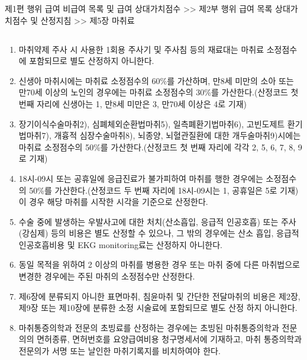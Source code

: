 \begin{mdframed}[linecolor=blue,middlelinewidth=2]  
제1편 행위 급여 \cntrdot{}  비급여 목록 및 급여 상대가치점수 >> 제2부 행위 급여 목록\cntrdot{} 상대가치점수 및 산정지침 >> 제5장 마취료
\end{mdframed}
\subsection{}
\begin{enumerate}[(1)]\tightlist
\item 마취약제 주사 시 사용한 1회용 주사기 및 주사침 등의 재료대는 마취료 소정점수에 포함되므로 별도 산정하지 아니한다.
\item 신생아 마취시에는 마취료 소정점수의 60\%를 가산하며, 만8세 미만의 소아 또는 만70세 이상의 노인의 경우에는 마취료 소정점수의 30\%를 가산한다.(산정코드 첫 번째 자리에 신생아는 1, 만8세 미만은 3, 만70세 이상은 4로 기재)
\item 장기이식수술마취2), 심폐체외순환법마취5), 일측폐환기법마취6), 고빈도제트 환기법마취7), 개흉적 심장수술마취8), 뇌종양, 뇌혈관질환에 대한 개두술마취9)시에는 마취료 소정점수의 50\%를 가산한다.(산정코드 첫 번째 자리에 각각 2, 5, 6, 7, 8, 9로 기재)
\item 18시-09시 또는 공휴일에 응급진료가 불가피하여 마취를 행한 경우에는 소정점수의 50\%를 가산한다.(산정코드 두 번째 자리에 18시-09시는 1, 공휴일은 5로 기재) 이 경우 해당 마취를 시작한 시각을 기준으로 산정한다.
\item 수술 중에 발생하는 우발사고에 대한 처치(산소흡입, 응급적 인공호흡) 또는 주사(강심제) 등의 비용은 별도 산정할 수 있으나, 그 밖의 경우에는 산소 흡입, 응급적 인공호흡비용 및 EKG monitoring료는 산정하지 아니한다.
\item 동일 목적을 위하여 2 이상의 마취를 병용한 경우 또는 마취 중에 다른 마취법으로 변경한 경우에는 주된 마취의 소정점수만 산정한다.
\item 제6장에 분류되지 아니한 표면마취, 침윤마취 및 간단한 전달마취의 비용은 제2장, 제9장 또는 제10장에 분류한 소정 시술료에 포함되므로 별도 산정 하지 아니한다.
\item 마취통증의학과 전문의 초빙료를 산정하는 경우에는 초빙된 마취통증의학과 전문의의 면허종류, 면허번호를 요양급여비용 청구명세서에 기재하고, 마취 통증의학과 전문의가 서명 또는 날인한 마취기록지를 비치하여야 한다.
\end{enumerate}